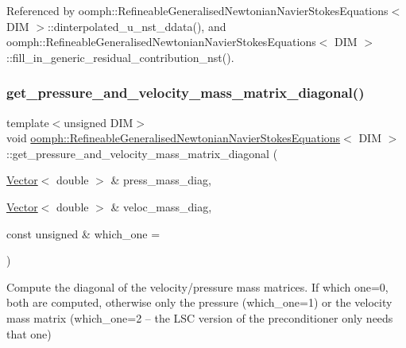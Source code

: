 Referenced by oomph\+::\+Refineable\+Generalised\+Newtonian\+Navier\+Stokes\+Equations$<$ D\+I\+M $>$\+::dinterpolated\+\_\+u\+\_\+nst\+\_\+ddata(), and oomph\+::\+Refineable\+Generalised\+Newtonian\+Navier\+Stokes\+Equations$<$ D\+I\+M $>$\+::fill\+\_\+in\+\_\+generic\+\_\+residual\+\_\+contribution\+\_\+nst().

\mbox{\label{classoomph_1_1RefineableGeneralisedNewtonianNavierStokesEquations_af66689b596908f67bf4af1ad9d6c11eb}} 
\subsubsection{\texorpdfstring{get\+\_\+pressure\+\_\+and\+\_\+velocity\+\_\+mass\+\_\+matrix\+\_\+diagonal()}{get\_pressure\_and\_velocity\_mass\_matrix\_diagonal()}}
{\footnotesize\ttfamily template$<$unsigned D\+IM$>$ \\
void \hyperlink{classoomph_1_1RefineableGeneralisedNewtonianNavierStokesEquations}{oomph\+::\+Refineable\+Generalised\+Newtonian\+Navier\+Stokes\+Equations}$<$ D\+IM $>$\+::get\+\_\+pressure\+\_\+and\+\_\+velocity\+\_\+mass\+\_\+matrix\+\_\+diagonal (\begin{DoxyParamCaption}\item[{\hyperlink{classoomph_1_1Vector}{Vector}$<$ double $>$ \&}]{press\+\_\+mass\+\_\+diag,  }\item[{\hyperlink{classoomph_1_1Vector}{Vector}$<$ double $>$ \&}]{veloc\+\_\+mass\+\_\+diag,  }\item[{const unsigned \&}]{which\+\_\+one = {} }\end{DoxyParamCaption})\hspace{0.3cm}{\ttfamily [virtual]}}



Compute the diagonal of the velocity/pressure mass matrices. If which one=0, both are computed, otherwise only the pressure (which\+\_\+one=1) or the velocity mass matrix (which\+\_\+one=2 -- the L\+SC version of the preconditioner only needs that one) 

